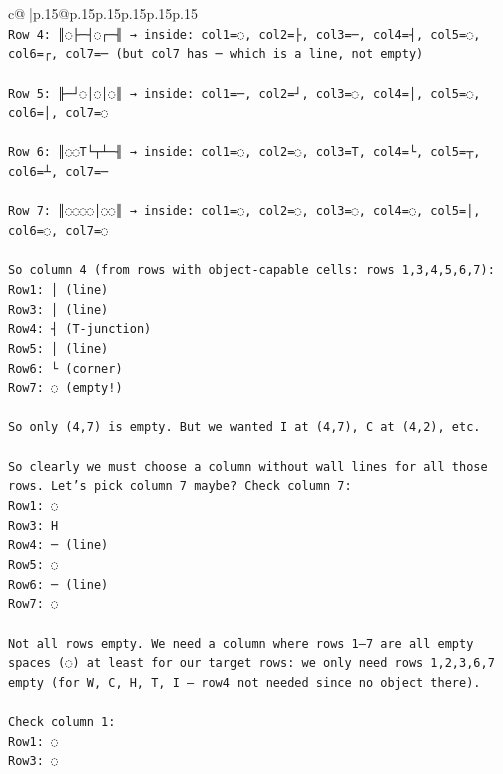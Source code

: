 \documentclass{article}
\begin{document}
{\begin{supertabular}{c@{$\;$}|p{.15\linewidth}@{}p{.15\linewidth}p{.15\linewidth}p{.15\linewidth}p{.15\linewidth}p{.15\linewidth}}
{{{\\ 
\texttt{Row 4: ║◌├─┤◌┌─╢ → inside: col1=◌, col2=├, col3=─, col4=┤, col5=◌, col6=┌, col7=─ (but col7 has ─ which is a line, not empty)} \\
\\ 
\texttt{Row 5: ╟─┘◌│◌│◌║ → inside: col1=─, col2=┘, col3=◌, col4=│, col5=◌, col6=│, col7=◌} \\
\\ 
\texttt{Row 6: ║◌◌T└┬┴─╢ → inside: col1=◌, col2=◌, col3=T, col4=└, col5=┬, col6=┴, col7=─} \\
\\ 
\texttt{Row 7: ║◌◌◌◌│◌◌║ → inside: col1=◌, col2=◌, col3=◌, col4=◌, col5=│, col6=◌, col7=◌} \\
\\ 
\texttt{So column 4 (from rows with object{-}capable cells: rows 1,3,4,5,6,7):  } \\
\texttt{Row1: │ (line)  } \\
\texttt{Row3: │ (line)  } \\
\texttt{Row4: ┤ (T{-}junction)  } \\
\texttt{Row5: │ (line)  } \\
\texttt{Row6: └ (corner)  } \\
\texttt{Row7: ◌ (empty!)} \\
\\ 
\texttt{So only (4,7) is empty. But we wanted I at (4,7), C at (4,2), etc.} \\
\\ 
\texttt{So clearly we must choose a column without wall lines for all those rows. Let's pick column 7 maybe? Check column 7:  } \\
\texttt{Row1: ◌  } \\
\texttt{Row3: H  } \\
\texttt{Row4: ─ (line)  } \\
\texttt{Row5: ◌  } \\
\texttt{Row6: ─ (line)  } \\
\texttt{Row7: ◌  } \\
\\ 
\texttt{Not all rows empty. We need a column where rows 1–7 are all empty spaces (◌) at least for our target rows: we only need rows 1,2,3,6,7 empty (for W, C, H, T, I — row4 not needed since no object there).  } \\
\\ 
\texttt{Check column 1:  } \\
\texttt{Row1: ◌  } \\
\texttt{Row3: ◌  } \\
}}}
\end{supertabular}}
\end{document}
